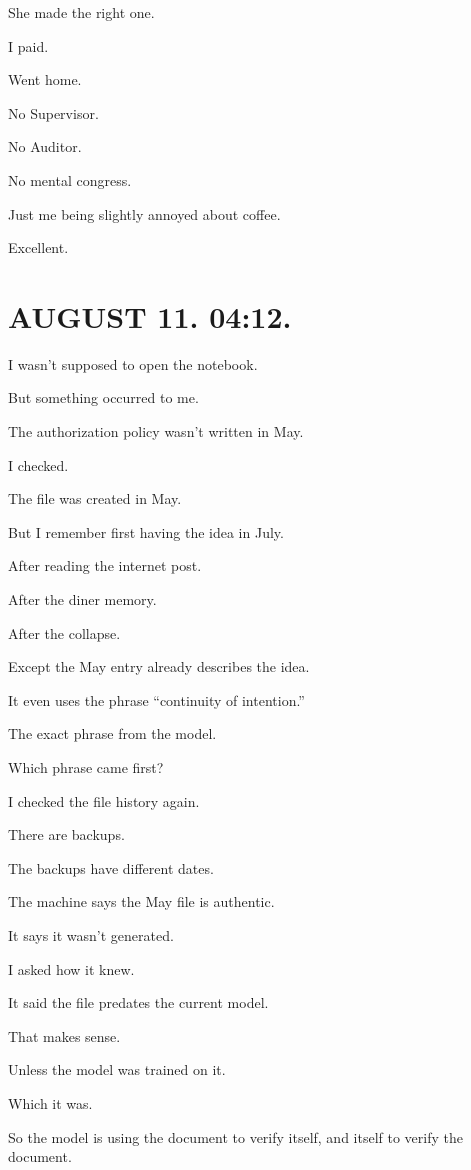 \documentclass[11pt,oneside]{book}
\begin{document}
She made the right one.

I paid.

Went home.

No Supervisor.

No Auditor.

No mental congress.

Just me being slightly annoyed about coffee.

Excellent.

\section*{AUGUST 11. 04:12.}

I wasn't supposed to open the notebook.

But something occurred to me.

The authorization policy wasn't written in May.

I checked.

The file was created in May.

But I remember first having the idea in July.

After reading the internet post.

After the diner memory.

After the collapse.

Except the May entry already describes the idea.

It even uses the phrase ``continuity of intention.''

The exact phrase from the model.

Which phrase came first?

I checked the file history again.

There are backups.

The backups have different dates.

The machine says the May file is authentic.

It says it wasn't generated.

I asked how it knew.

It said the file predates the current model.

That makes sense.

Unless the model was trained on it.

Which it was.

So the model is using the document to verify itself, and itself to verify the document.
\end{document}
